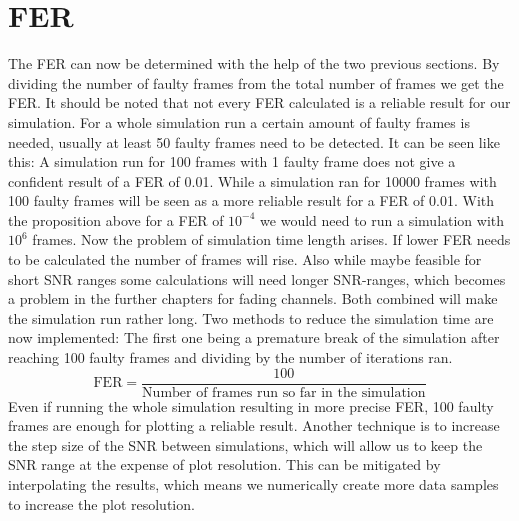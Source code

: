 \section{FER}
\label{sec:FER}
The \gls{FER} can now be determined with the help of the two previous sections. By dividing the number of faulty frames from the total number of frames we get the \gls{FER}. It should be noted that not every \gls{FER} calculated is a reliable result for our simulation. For a whole simulation run a certain amount of faulty frames is needed, usually at least 50 faulty frames need to be detected. It can be seen like this: A simulation run for 100 frames with 1 faulty frame does not give a confident result of a \gls{FER} of 0.01. While a simulation ran for 10000 frames with 100 faulty frames will be seen as a more reliable result for a \gls{FER} of 0.01. 
\newline
With the proposition above for a \gls{FER} of $10^{-4}$ we would need to run a simulation with $10^6$ frames. Now the problem of simulation time length arises. If lower \gls{FER} needs to be calculated the number of frames will rise. Also while maybe feasible for short SNR ranges some calculations will need longer SNR-ranges, which becomes a problem in the further chapters for fading channels. Both combined will make the simulation run rather long.
\newline
Two methods to reduce the simulation time are now implemented: The first one being a premature break of the simulation after reaching 100 faulty frames and dividing by the number of iterations ran.
\begin{equation}
\textrm{FER} = \frac{100}{\textrm{Number of frames run so far in the simulation}}
\end{equation}
Even if running the whole simulation resulting in more precise \gls{FER}, 100 faulty frames are enough for plotting a reliable result. Another technique is to increase the step size of the SNR between simulations, which will allow us to keep the SNR range at the expense of plot resolution. This can be mitigated by interpolating the results, which means we numerically create more data samples to increase the plot resolution.

\newpage
